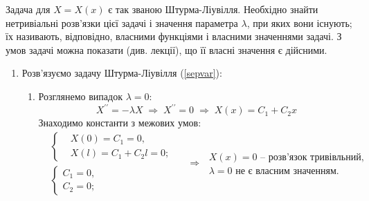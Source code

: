 Задача для $X = X(x)$ є так званою Штурма-Ліувілля. Необхідно знайти нетривіальні розв'язки цієї задачі і значення параметра   $\lambda$, при яких вони існують; їх називають, відповідно, власними функціями і власними значеннями задачі. З умов задачі можна показати (див. лекції), що її власні значення є дійсними.\\
\begin{enumerate}
    \item[] Розв'язуємо задачу Штурма-Ліувілля (\ref{sepvar}):
    \begin{enumerate}[wide, labelindent=0pt]
        \item Розглянемо випадок $\lambda = 0$:
        \begin{equation*}
            X^{\prime\prime} = -\lambda X
            \;\Rightarrow\;
            X^{\prime\prime} = 0
            \;\Rightarrow\;
            X(x) = C_1 + C_2 x
        \end{equation*}
        Знаходимо константи з межових умов:
        \begin{equation*}
            \begin{aligned}
                &\left\{ \begin{aligned}
                    &X(0) = C_1 = 0, \\ 
                    &X(l) = C_1 + C_2 l = 0;
                \end{aligned} \right.
                \\   
                &\left\{ \begin{aligned}
                    C_1 = 0, \\ 
                    C_2 = 0;
                \end{aligned} \right.
            \end{aligned}
            \quad\Rightarrow\;
            \begin{aligned}
                X(x) = 0 \text{ -- розв'язок тривівльний,}\\
                \lambda = 0 \text{ не є власним значенням.}
            \end{aligned}
        \end{equation*}
    

\end{enumerate}
\end{enumerate}
